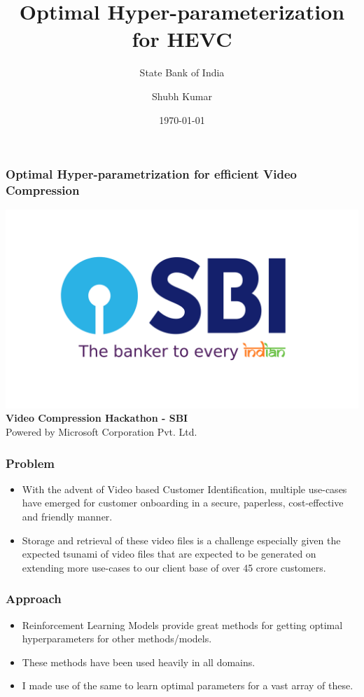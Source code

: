 \documentclass{beamer}
\title{Optimal Hyper-parameterization for HEVC}
\subtitle{State Bank of India}
\author{Shubh Kumar}
\institute{IIT Bombay}
\date{\today}
\begin{document}
\begin{frame}
    \frametitle{Optimal Hyper-parametrization for efficient Video Compression}
    \begin{center}
        \includegraphics[scale=0.02]{im.png}\\
        \textbf{Video Compression Hackathon - SBI} \\

        Powered by Microsoft Corporation Pvt. Ltd.
    \end{center}


\end{frame}



\begin{frame}
    \frametitle{Problem}
    \begin{itemize}
        \item With the advent of Video based Customer Identification, multiple use-cases have emerged for customer onboarding in a secure, paperless, cost-effective and friendly manner.%
        \item Storage and retrieval of these video files is a challenge especially given the expected tsunami of video files that are expected to be generated on extending more use-cases to our client base of over 45 crore customers.
    \end{itemize}
\end{frame}


\begin{frame}
    \frametitle{Approach}
    \begin{itemize}
        \item Reinforcement Learning Models provide great methods for getting optimal hyperparameters for other methods/models.
        \item These methods have been used heavily in all domains.
        \item I made use of the same to learn optimal parameters for a vast array of these.
    \end{itemize}
\end{frame}
\end{document}
